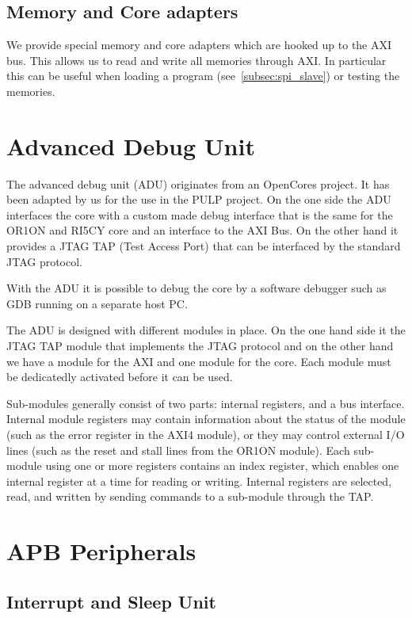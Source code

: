 \subsection{Memory and Core adapters}

We provide special memory and core adapters which are hooked up to the AXI bus. This allows us to read and write all memories through AXI. In particular this can be useful when loading a program (see~\ref{subsec:spi_slave}) or testing the memories.

\section{Advanced Debug Unit}

The advanced debug unit (ADU) originates from an OpenCores project. It has been adapted by us for the use in the PULP project. On the one side the ADU interfaces the core with a custom made debug interface that is the same for the OR1ON and RI5CY core and an interface to the AXI Bus. On the other hand it provides a JTAG TAP (Test Access Port) that can be interfaced by the standard JTAG protocol.

With the ADU it is possible to debug the core by a software debugger such as GDB running on a separate host PC.

The ADU is designed with different modules in place. On the one hand side it the JTAG TAP module that implements the JTAG protocol and on the other hand we have a module for the AXI and one module for the core. Each module must be dedicatedly activated before it can be used.

Sub-modules generally consist of two parts: internal registers, and a bus interface. Internal module registers may contain information about the status of the module (such as the error register in the AXI4 module), or they may control external I/O lines (such as the reset and stall lines from the OR1ON module). Each sub-module using one or more registers contains an index register, which enables one internal register at a time for reading or writing. Internal registers are selected, read, and written by sending commands to a sub-module through the TAP.


\section{APB Peripherals}

\subsection{Interrupt and Sleep Unit}

